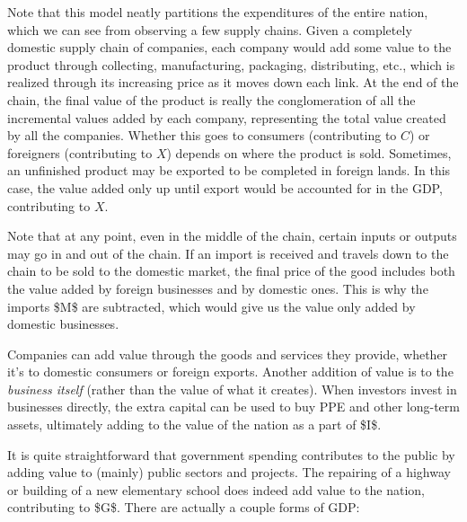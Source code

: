 \documentclass{article}
\begin{document}
  Note that this model neatly partitions the expenditures of the entire nation, which we can see from observing a few supply chains. Given a completely domestic supply chain of companies, each company would add some value to the product through collecting, manufacturing, packaging, distributing, etc., which is realized through its increasing price as it moves down each link. At the end of the chain, the final value of the product is really the conglomeration of all the incremental values added by each company, representing the total value created by all the companies. Whether this goes to consumers (contributing to $C$) or foreigners (contributing to $X$) depends on where the product is sold. Sometimes, an unfinished product may be exported to be completed in foreign lands. In this case, the value added only up until export would be accounted for in the GDP, contributing to $X$.
  \begin{center}
  \end{center}
  Note that at any point, even in the middle of the chain, certain inputs or outputs may go in and out of the chain. If an import is received and travels down to the chain to be sold to the domestic market, the final price of the good includes both the value added by foreign businesses and by domestic ones. This is why the imports \$M\$ are subtracted, which would give us the value only added by domestic businesses.
  \begin{center}
  \end{center}
  Companies can add value through the goods and services they provide, whether it's to domestic consumers or foreign exports. Another addition of value is to the \textit{business itself} (rather than the value of what it creates). When investors invest in businesses directly, the extra capital can be used to buy PPE and other long-term assets, ultimately adding to the value of the nation as a part of \$I\$.
  \begin{center}
  \end{center}
  It is quite straightforward that government spending contributes to the public by adding value to (mainly) public sectors and projects. The repairing of a highway or building of a new elementary school does indeed add value to the nation, contributing to \$G\$.
  There are actually a couple forms of GDP:
\end{document}
